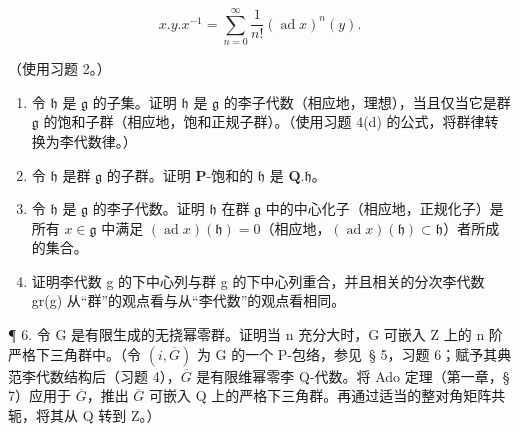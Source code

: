 \[
x. y. x ^ {- 1} = \sum_ {n = 0} ^ {\infty} \frac {1}{n !} (\operatorname{ad} x) ^ {n} (y).
\]

（使用习题 2。）

\begin{enumerate}
\def\labelenumi{(\alph{enumi})}
\setcounter{enumi}{1}
\item
  令 \(\mathfrak{h}\) 是 \(\mathfrak{g}\) 的子集。证明 \(\mathfrak{h}\) 是 \(\mathfrak{g}\) 的李子代数（相应地，理想），当且仅当它是群 \(\mathfrak{g}\) 的饱和子群（相应地，饱和正规子群）。（使用习题 4(d) 的公式，将群律转换为李代数律。）
\item
  令 \(\mathfrak{h}\) 是群 \(\mathfrak{g}\) 的子群。证明 \(\mathbf{P}\)-饱和的 \(\mathfrak{h}\) 是 \(\mathbf{Q}.\mathfrak{h}\)。
\item
  令 \(\mathfrak{h}\) 是 \(\mathfrak{g}\) 的李子代数。证明 \(\mathfrak{h}\) 在群 \(\mathfrak{g}\) 中的中心化子（相应地，正规化子）是所有 \(x \in \mathfrak{g}\) 中满足 \((\operatorname{ad} x)(\mathfrak{h}) = 0\)（相应地，\((\operatorname{ad} x)(\mathfrak{h}) \subset \mathfrak{h}\)）者所成的集合。
\item
  证明李代数 g 的下中心列与群 g 的下中心列重合，并且相关的分次李代数 gr(g) 从“群”的观点看与从“李代数”的观点看相同。
\end{enumerate}

¶ 6. 令 G 是有限生成的无挠幂零群。证明当 n 充分大时，G 可嵌入 Z 上的 n 阶严格下三角群中。（令 \((i, \overline{G})\) 为 G 的一个 P-包络，参见~§ 5，习题 6；赋予其典范李代数结构后（习题 4），\(\overline{G}\) 是有限维幂零李 Q-代数。将 Ado 定理（第一章，§ 7）应用于 \(\overline{G}\)，推出 \(\overline{G}\) 可嵌入 Q 上的严格下三角群。再通过适当的整对角矩阵共轭，将其从 Q 转到 Z。）

